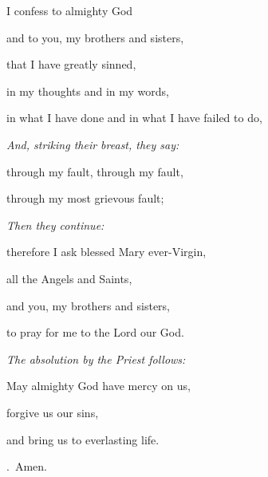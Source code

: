 I confess to almighty God

and to you, my brothers and sisters,

that I have greatly sinned,

in my thoughts and in my words,

in what I have done and in what I have failed to do,

\vspace{5pt} \emph{And, striking their breast, they say:} \vspace{5pt}

through my fault, through my fault,

through my most grievous fault;

\vspace{5pt} \emph{Then they continue:}\vspace{5pt}

therefore I ask blessed Mary ever-Virgin,

all the Angels and Saints,

and you, my brothers and sisters,

to pray for me to the Lord our God.

\vspace{5pt} \emph{The absolution by the Priest follows:}\vspace{5pt}

May almighty God have mercy on us,

forgive us our sins,

and bring us to everlasting life.

\Rbar.~Amen.
